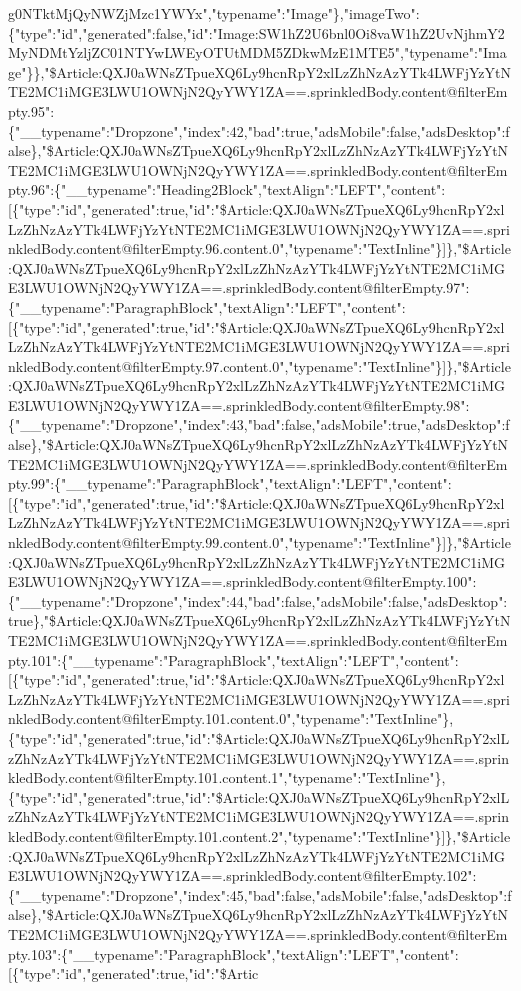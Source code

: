 g0NTktMjQyNWZjMzc1YWYx","typename":"Image"\},"imageTwo":\{"type":"id","generated":false,"id":"Image:SW1hZ2U6bnl0Oi8vaW1hZ2UvNjhmY2MyNDMtYzljZC01NTYwLWEyOTUtMDM5ZDkwMzE1MTE5","typename":"Image"\}\},"\$Article:QXJ0aWNsZTpueXQ6Ly9hcnRpY2xlLzZhNzAzYTk4LWFjYzYtNTE2MC1iMGE3LWU1OWNjN2QyYWY1ZA==.sprinkledBody.content@filterEmpty.95":\{"\_\_typename":"Dropzone","index":42,"bad":true,"adsMobile":false,"adsDesktop":false\},"\$Article:QXJ0aWNsZTpueXQ6Ly9hcnRpY2xlLzZhNzAzYTk4LWFjYzYtNTE2MC1iMGE3LWU1OWNjN2QyYWY1ZA==.sprinkledBody.content@filterEmpty.96":\{"\_\_typename":"Heading2Block","textAlign":"LEFT","content":{[}\{"type":"id","generated":true,"id":"\$Article:QXJ0aWNsZTpueXQ6Ly9hcnRpY2xlLzZhNzAzYTk4LWFjYzYtNTE2MC1iMGE3LWU1OWNjN2QyYWY1ZA==.sprinkledBody.content@filterEmpty.96.content.0","typename":"TextInline"\}{]}\},"\$Article:QXJ0aWNsZTpueXQ6Ly9hcnRpY2xlLzZhNzAzYTk4LWFjYzYtNTE2MC1iMGE3LWU1OWNjN2QyYWY1ZA==.sprinkledBody.content@filterEmpty.97":\{"\_\_typename":"ParagraphBlock","textAlign":"LEFT","content":{[}\{"type":"id","generated":true,"id":"\$Article:QXJ0aWNsZTpueXQ6Ly9hcnRpY2xlLzZhNzAzYTk4LWFjYzYtNTE2MC1iMGE3LWU1OWNjN2QyYWY1ZA==.sprinkledBody.content@filterEmpty.97.content.0","typename":"TextInline"\}{]}\},"\$Article:QXJ0aWNsZTpueXQ6Ly9hcnRpY2xlLzZhNzAzYTk4LWFjYzYtNTE2MC1iMGE3LWU1OWNjN2QyYWY1ZA==.sprinkledBody.content@filterEmpty.98":\{"\_\_typename":"Dropzone","index":43,"bad":false,"adsMobile":true,"adsDesktop":false\},"\$Article:QXJ0aWNsZTpueXQ6Ly9hcnRpY2xlLzZhNzAzYTk4LWFjYzYtNTE2MC1iMGE3LWU1OWNjN2QyYWY1ZA==.sprinkledBody.content@filterEmpty.99":\{"\_\_typename":"ParagraphBlock","textAlign":"LEFT","content":{[}\{"type":"id","generated":true,"id":"\$Article:QXJ0aWNsZTpueXQ6Ly9hcnRpY2xlLzZhNzAzYTk4LWFjYzYtNTE2MC1iMGE3LWU1OWNjN2QyYWY1ZA==.sprinkledBody.content@filterEmpty.99.content.0","typename":"TextInline"\}{]}\},"\$Article:QXJ0aWNsZTpueXQ6Ly9hcnRpY2xlLzZhNzAzYTk4LWFjYzYtNTE2MC1iMGE3LWU1OWNjN2QyYWY1ZA==.sprinkledBody.content@filterEmpty.100":\{"\_\_typename":"Dropzone","index":44,"bad":false,"adsMobile":false,"adsDesktop":true\},"\$Article:QXJ0aWNsZTpueXQ6Ly9hcnRpY2xlLzZhNzAzYTk4LWFjYzYtNTE2MC1iMGE3LWU1OWNjN2QyYWY1ZA==.sprinkledBody.content@filterEmpty.101":\{"\_\_typename":"ParagraphBlock","textAlign":"LEFT","content":{[}\{"type":"id","generated":true,"id":"\$Article:QXJ0aWNsZTpueXQ6Ly9hcnRpY2xlLzZhNzAzYTk4LWFjYzYtNTE2MC1iMGE3LWU1OWNjN2QyYWY1ZA==.sprinkledBody.content@filterEmpty.101.content.0","typename":"TextInline"\},\{"type":"id","generated":true,"id":"\$Article:QXJ0aWNsZTpueXQ6Ly9hcnRpY2xlLzZhNzAzYTk4LWFjYzYtNTE2MC1iMGE3LWU1OWNjN2QyYWY1ZA==.sprinkledBody.content@filterEmpty.101.content.1","typename":"TextInline"\},\{"type":"id","generated":true,"id":"\$Article:QXJ0aWNsZTpueXQ6Ly9hcnRpY2xlLzZhNzAzYTk4LWFjYzYtNTE2MC1iMGE3LWU1OWNjN2QyYWY1ZA==.sprinkledBody.content@filterEmpty.101.content.2","typename":"TextInline"\}{]}\},"\$Article:QXJ0aWNsZTpueXQ6Ly9hcnRpY2xlLzZhNzAzYTk4LWFjYzYtNTE2MC1iMGE3LWU1OWNjN2QyYWY1ZA==.sprinkledBody.content@filterEmpty.102":\{"\_\_typename":"Dropzone","index":45,"bad":false,"adsMobile":false,"adsDesktop":false\},"\$Article:QXJ0aWNsZTpueXQ6Ly9hcnRpY2xlLzZhNzAzYTk4LWFjYzYtNTE2MC1iMGE3LWU1OWNjN2QyYWY1ZA==.sprinkledBody.content@filterEmpty.103":\{"\_\_typename":"ParagraphBlock","textAlign":"LEFT","content":{[}\{"type":"id","generated":true,"id":"\$Artic